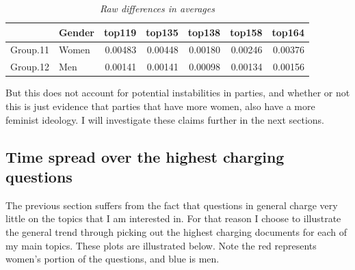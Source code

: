 \documentclass[12pt]{article}
\begin{document}
	\begin{table}[ht]
		\centering
		\caption{\textit{Raw differences in averages}}
		\begin{tabular}{rlrrrrr}
			\hline
			& Gender & top119 & top135 & top138 & top158 & top164 \\ 
			\hline
			Group.11 & Women & 0.00483 & 0.00448 & 0.00180 & 0.00246 & 0.00376 \\ 
			Group.12 & Men & 0.00141 & 0.00141 & 0.00098 & 0.00134 & 0.00156 \\ 
			\hline
		\end{tabular}
	\end{table}
	
	But this does not account for potential instabilities in parties, and whether or not this is just evidence that parties that have more women, also have a more feminist ideology. I will investigate these claims further in the next sections.
	
	\subsection{Time spread over the highest charging questions}
	
	The previous section suffers from the fact that questions in general charge very little on the topics that I am interested in. For that reason I choose to illustrate the general trend through picking out the highest charging documents for each of my main topics. These plots are illustrated below. Note the red represents women's portion of the questions, and blue is men.
	
\end{document}
